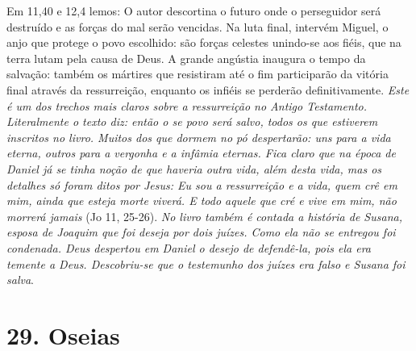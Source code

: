 \documentclass[
]{book}
\begin{document}
Em 11,40 e 12,4 lemos: O autor descortina o futuro onde o perseguidor será destruído e as forças do mal serão vencidas. Na luta final, intervém Miguel, o anjo que protege o povo escolhido: são forças celestes unindo-se aos fiéis, que na terra lutam pela causa de Deus. A grande angústia inaugura o tempo da salvação: também os mártires que resistiram até o fim participarão da vitória final através da ressurreição, enquanto os infiéis se perderão definitivamente. \emph{Este é um dos trechos mais claros sobre a ressurreição no Antigo Testamento. Literalmente o texto diz: então o se povo será salvo, todos os que estiverem inscritos no livro. Muitos dos que dormem no pó despertarão: uns para a vida eterna, outros para a vergonha e a infâmia eternas. Fica claro que na época de Daniel já se tinha noção de que haveria outra vida, além desta vida, mas os detalhes só foram ditos por Jesus: Eu sou a ressurreição e a vida, quem crê em mim, ainda que esteja morte viverá. E todo aquele que cré e vive em mim, não morrerá jamais} (Jo 11, 25-26). \emph{No livro também é contada a história de Susana, esposa de Joaquim que foi deseja por dois juízes. Como ela não se entregou foi condenada. Deus despertou em Daniel o desejo de defendê-la, pois ela era temente a Deus. Descobriu-se que o testemunho dos juízes era falso e Susana foi salva}.

\hypertarget{oseias}{%
\section*{29. Oseias}\label{oseias}}
\end{document}
